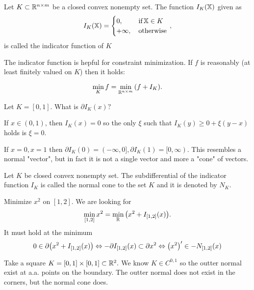 \documentclass[reqno, a4paper]{article}
\begin{document}
\begin{definition}
    Let $K \subset \R^{n \times m}$ be a closed convex nonempty set. The function $I_K\qty(\tensorq{X})$ given as
    \[
	    I_K\qty(\tensorq{X})=\begin{cases}
		    0, & \, \text{if} \, \tensorq{X} \in K \\
		    + \infty,& \, \text{otherwise} \,
	    \end{cases},
    \]
    is called the indicator function of $K$
\end{definition}

The indicator function is hepful for constraint minimization. If $f$ is reasonably (at least finitely valued on $K$) then it holds:

\[
	\min_K f = \min_{\R^{n \times m}}\qty(f + I_K).
\]

\begin{example}

	Let $K = [0,1].$ What is $\partial I_K(x)?$ 

	If $x \in (0,1)$, then $I_K(x) = 0$ so the only $\xi$ such that $I_K(y) \geq 0 + \xi (y-x)$ holds is $\xi = 0.$

	If $x = 0, x=1$ then $\partial I_K(0) = (-\infty, 0], \partial I_K(1) = [0, \infty).$ This resembles a normal "vector", but in fact it is not a single vector and more a "cone" of vectors.
\end{example}

\begin{definition}
    Let $K$ be closed convex nonempty set. The subdifferential of the indicator function $I_K$ is called the normal cone to the set $K$ and it is denoted by $N_K$.
\end{definition}

\begin{example}
	Minimize $x^{2}$ on $[1,2]$. We are looking for
	\[
		\min_{[1,2]}x^{2} = \min_{\R}\qty(x^{2}+I_{[1,2]}\qty(x)).
	\]
	It must hold at the minimum
	\[
		0 \in \partial \qty(x^{2}+I_{[1,2]}\qty(x)) \Leftrightarrow - \partial I_{[1,2]}(x) \subset \partial x^{2} \Leftrightarrow \qty(x^{2})' \in -N_{[1,2]}(x)
	\]
\end{example}

\begin{example}
	Take a square $K = [0,1] \times [0,1] \subset \R^2.$ We know $K \in C^{0,1}$ so the outter normal exist at a.a. points on the boundary. The outter normal does not exist in the corners, but the normal cone does.
	\begin{tikzpicture}
	\end{tikzpicture}
\end{example}
\end{document}
